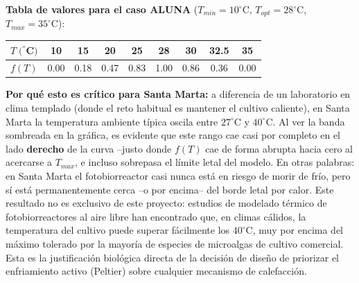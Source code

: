 \documentclass[11pt,a4paper]{article}
\begin{document}
\textbf{Tabla de valores para el caso ALUNA} ($T_{min}=10^\circ$C, $T_{opt}=28^\circ$C, $T_{max}=35^\circ$C):
\begin{center}
\footnotesize
\begin{tabular}{ccccccccc}
\toprule
$T\;(^\circ$C$)$ & 10 & 15 & 20 & 25 & 28 & 30 & 32.5 & 35\\
\midrule
$f(T)$ & 0.00 & 0.18 & 0.47 & 0.83 & 1.00 & 0.86 & 0.36 & 0.00\\
\bottomrule
\end{tabular}
\end{center}

\begin{center}
\end{center}

\textbf{Por qué esto es crítico para Santa Marta:} a diferencia de un laboratorio en clima templado (donde el reto habitual es mantener el cultivo caliente), en Santa Marta la temperatura ambiente típica oscila entre $27^\circ$C y $40^\circ$C. Al ver la banda sombreada en la gráfica, es evidente que este rango cae casi por completo en el lado \textbf{derecho} de la curva --justo donde $f(T)$ cae de forma abrupta hacia cero al acercarse a $T_{max}$, e incluso sobrepasa el límite letal del modelo. En otras palabras: en Santa Marta el fotobiorreactor casi nunca está en riesgo de morir de frío, pero sí está permanentemente cerca --o por encima-- del borde letal por calor. Este resultado no es exclusivo de este proyecto: estudios de modelado térmico de fotobiorreactores al aire libre han encontrado que, en climas cálidos, la temperatura del cultivo puede superar fácilmente los $40^\circ$C, muy por encima del máximo tolerado por la mayoría de especies de microalgas de cultivo comercial. Esta es la justificación biológica directa de la decisión de diseño de priorizar el enfriamiento activo (Peltier) sobre cualquier mecanismo de calefacción.
\end{document}
